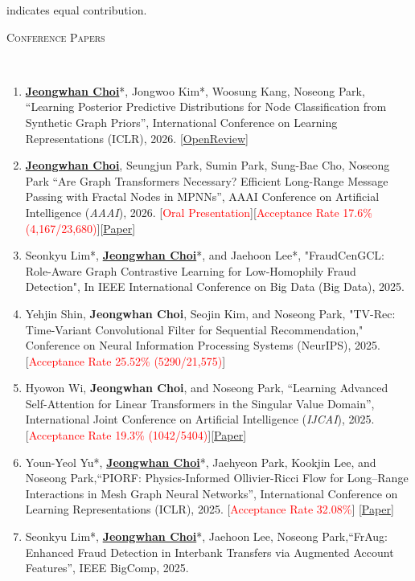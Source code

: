 \documentclass[10pt]{article}
\newenvironment{changemargin}[2]{
  \begin{list}{}{
    \setlength{\topsep}{0pt}
    \setlength{\leftmargin}{#1}
    \setlength{\rightmargin}{#2}
    \setlength{\listparindent}{\parindent}
    \setlength{\itemindent}{\parindent}
    \setlength{\parsep}{\parskip}
  }
  \item[]}{\end{list}
}
\newcommand{\lineover}{
	\begin{changemargin}{-0.05in}{-0.05in}
		\vspace*{-8pt}
		\hrulefill \\
		\vspace*{-2pt}
	\end{changemargin}
}
\newcommand{\RED}[1]{\textcolor{red}{#1}}
\newcommand{\textbu}[1]{\underline{\textbf{#1}}}
\newenvironment{body} {
	\vspace*{-16pt}
	\begin{changemargin}{-0.25in}{-0.5in}
  }
	{\end{changemargin}
}
\begin{document}
\begin{body}
	\vspace{14pt}
{\small * indicates equal contribution.}
	\vspace{14pt}

\textsc{Conference Papers}
\lineover
\begin{enumerate}
    \item \textbu{Jeongwhan Choi}*, Jongwoo Kim*, Woosung Kang, Noseong Park, ``Learning Posterior Predictive Distributions for Node Classification from Synthetic Graph Priors'', International Conference on Learning Representations (ICLR), 2026. [\href{https://openreview.net/forum?id=qkBBHixPow}{OpenReview}]
    \item \textbu{Jeongwhan Choi}, Seungjun Park, Sumin Park, Sung-Bae Cho, Noseong Park ``Are Graph Transformers Necessary? Efficient Long-Range Message Passing with Fractal Nodes in MPNNs'', AAAI Conference on Artificial Intelligence (\textit{AAAI}), 2026. [\RED{Oral Presentation}][\RED{Acceptance Rate 17.6\% (4,167/23,680)}][\href{https://ojs.aaai.org/index.php/AAAI/article/view/39191}{Paper}]
    \item Seonkyu Lim*, \textbu{Jeongwhan Choi}*, and Jaehoon Lee*, "FraudCenGCL: Role-Aware Graph Contrastive Learning for Low-Homophily Fraud Detection",  In IEEE International Conference on Big Data (Big Data), 2025.
    \item Yehjin Shin, \textbf{Jeongwhan Choi}, Seojin Kim, and Noseong Park, "TV-Rec: Time-Variant Convolutional Filter for Sequential Recommendation,"  Conference on Neural Information Processing Systems (NeurIPS), 2025.  [\RED{Acceptance Rate 25.52\% (5290/21,575)}]
    \item Hyowon Wi, \textbf{Jeongwhan Choi}, and Noseong Park, ``Learning Advanced Self-Attention for Linear Transformers in the Singular Value Domain'', International Joint Conference on Artificial Intelligence (\textit{IJCAI}), 2025. [\RED{Acceptance Rate 19.3\% (1042/5404)}][\href{https://www.ijcai.org/proceedings/2025/0730}{Paper}]
    \item Youn-Yeol Yu*, \textbu{Jeongwhan Choi}*, Jaehyeon Park, Kookjin Lee, and Noseong Park,``PIORF: Physics-Informed Ollivier-Ricci Flow for Long–Range Interactions in Mesh Graph Neural Networks'', International Conference on Learning Representations (ICLR), 2025. [\RED{Acceptance Rate 32.08\%}] [\href{https://openreview.net/forum?id=qkBBHixPow}{Paper}]
    \item Seonkyu Lim*, \textbu{Jeongwhan Choi}*, Jaehoon Lee, Noseong Park,``FrAug: Enhanced Fraud Detection in Interbank Transfers via Augmented Account Features'', IEEE BigComp, 2025.

\end{enumerate}
\end{body}
\end{document}
